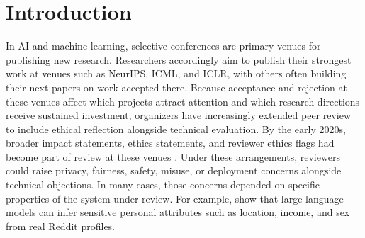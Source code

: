 \documentclass[sigconf,nonacm]{acmart} %
\begin{document}



\maketitle

\section{Introduction}

In AI and machine learning, selective conferences are primary venues for publishing new research. Researchers accordingly aim to publish their strongest work at venues such as NeurIPS, ICML, and ICLR, with others often building their next papers on work accepted there. Because acceptance and rejection at these venues affect which projects attract attention and which research directions receive sustained investment, organizers have increasingly extended peer review to include ethical reflection alongside technical evaluation. By the early 2020s, broader impact statements, ethics statements, and reviewer ethics flags had become part of review at these venues \citep{prunkl2021institutionalizing,neurips2021call,neurips2021retrospective,iclr2023ethics}. Under these arrangements, reviewers could raise privacy, fairness, safety, misuse, or deployment concerns alongside technical objections. In many cases, those concerns depended on specific properties of the system under review. For example, \citet{staab2024beyond} show that large language models can infer sensitive personal attributes such as location, income, and sex from real Reddit profiles.
\end{document}
